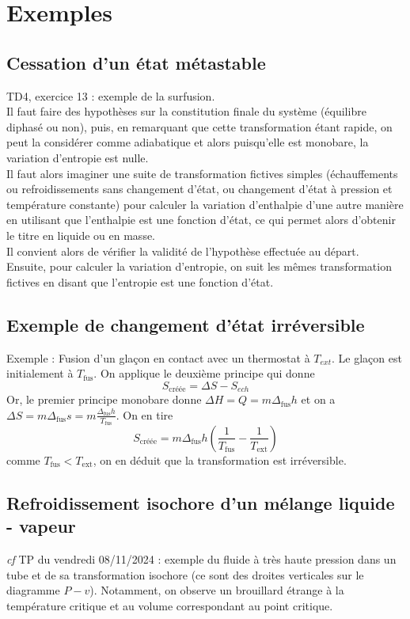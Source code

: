 \documentclass[french]{book}
\theoremstyle{plain}
\theoremstyle{definition}
\theoremstyle{remark}
\begin{document}
\section{Exemples}
\subsection{Cessation d'un état métastable}
TD4, exercice 13 : exemple de la surfusion. \\ Il faut faire des hypothèses sur la constitution finale du système (équilibre diphasé ou non), puis, en remarquant que cette transformation étant rapide, on peut la considérer comme adiabatique et alors puisqu'elle est monobare, la variation d'entropie est nulle. \\ Il faut alors imaginer une suite de transformation fictives simples (échauffements ou refroidissements sans changement d'état, ou changement d'état à pression et température constante) pour calculer la variation d'enthalpie d'une autre manière en utilisant que l'enthalpie est une fonction d'état, ce qui permet alors d'obtenir le titre en liquide ou en masse. \\ Il convient alors de vérifier la validité de l'hypothèse effectuée au départ. \\Ensuite, pour calculer la variation d'entropie, on suit les mêmes transformation fictives en disant que l'entropie est une fonction d'état.
\subsection{Exemple de changement d'état irréversible}
Exemple : Fusion d'un glaçon en contact avec un thermostat à $T_{ext}$. Le glaçon est initialement à $T_{\text{fus}}$. On applique le deuxième principe qui donne $$S_{\text{créée}}=\Delta S-S_{ech}$$ Or, le premier principe monobare donne $\Delta H =Q=m\Delta_{\text{fus}}h$ et on a $\Delta S=m\Delta_\text{fus}s=\displaystyle m\frac{\Delta_\text{fus}h}{T_{\text{fus}}}$. On en tire $$S_{\text{créée}}=m\Delta_\text{fus}h\left(\frac{1}{T_\text{fus}}-\frac{1}{T_\text{ext}}\right)$$ comme $T_\text{fus}<T_\text{ext}$, on en déduit que la transformation est irréversible.
\subsection{Refroidissement isochore d'un mélange liquide - vapeur}
\textit{cf} TP du vendredi 08/11/2024 : exemple du fluide à très haute pression dans un tube et de sa transformation isochore (ce sont des droites verticales sur le diagramme $P-v$). Notamment, on observe un brouillard étrange à la température critique et au volume correspondant au point critique.
\end{document}
